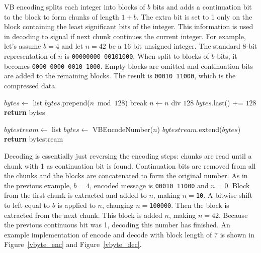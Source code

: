 VB encoding splits each integer into blocks of $b$ bits and adds a continuation bit to the block to form chunks of length $1+b$. The extra bit is set to 1 only
on the block containing the least significant bits of the integer. This information is used in decoding to signal if next chunk continues the current 
integer. For example, let's assume $b = 4$ and let $n = 42$ be a 16 bit unsigned integer. The standard 8-bit representation of $n$ is 
\texttt{00000000 00101000}. When split to blocks of $b$ bits, it becomes \texttt{0000 0000 0010 1000}. Empty blocks are omitted and continuation bits 
are added to the remaining blocks. The result is \texttt{00010 11000}, which is the compressed data.

\medskip
\noindent\begin{minipage}{.5\textwidth}
\begin{algorithmic}
\State $bytes\gets $ list
\State $bytes$.prepend($n \bmod 128$)
 \State break \EndIf
\State $n\gets n$ div $128$
\EndWhile
\State $bytes$.last() += $128$
\State \textbf{return} bytes
\EndFunction
{} \label{vbyte_enc}
\end{algorithmic}
\end{minipage}%
\begin{minipage}{.5\textwidth}
\begin{algorithmic}
\State $bytestream\gets $ list
\State $bytes \gets$ VBEncodeNumber($n$)
\State $bytestream$.extend($bytes$)
\EndFor
\State \textbf{return} bytestream
\EndFunction
\end{algorithmic}
\end{minipage}
\medskip 

Decoding is essentially just reversing the encoding steps: chunks are read until a chunk with 1 as continuation bit is found. Continuation bits 
are removed from all the chunks and the blocks are concatenated to form the original number. As in the previous example, $b = 4$, encoded message 
is \texttt{00010 11000} and $n = 0$. Block from the first chunk is extracted and added to $n$, making $n = $\texttt{10}. A bitwise shift to left 
equal to $b$ is applied to $n$, changing $n = $\texttt{100000}. Then the block is extracted from the next chunk. This block is added  $n$, making 
$n = 42$. Because the previous continuous bit was 1, decoding this number has finished. An example implementation of encode and decode with block 
length of 7 is shown in Figure~\ref{vbyte_enc} and Figure~\ref{vbyte_dec}.


